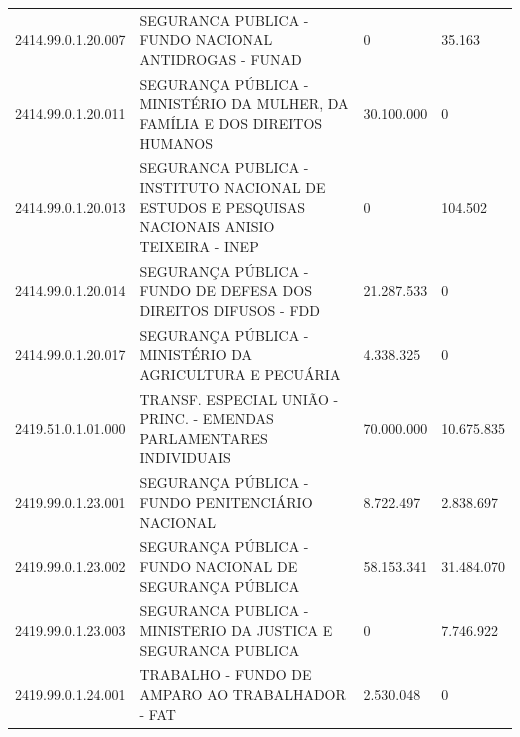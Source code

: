 \documentclass{article}
\begin{document}
\begin{longtable}[c]{m{2cm}|m{11cm}|m{2cm}m{2cm}}
\multicolumn{1}{C{2cm}|}{2414.99.0.1.20.007} & \multicolumn{1}{L{11cm}|}{SEGURANCA PUBLICA - FUNDO NACIONAL ANTIDROGAS - FUNAD} & \multicolumn{1}{R{2cm}|}{            0} & \multicolumn{1}{R{2cm}}{35.163} \\
\multicolumn{1}{C{2cm}|}{2414.99.0.1.20.011} & \multicolumn{1}{L{11cm}|}{SEGURANÇA PÚBLICA - MINISTÉRIO DA MULHER, DA FAMÍLIA E DOS DIREITOS HUMANOS} & \multicolumn{1}{R{2cm}|}{30.100.000} & \multicolumn{1}{R{2cm}}{            0} \\
\multicolumn{1}{C{2cm}|}{2414.99.0.1.20.013} & \multicolumn{1}{L{11cm}|}{SEGURANCA PUBLICA - INSTITUTO NACIONAL DE ESTUDOS E PESQUISAS NACIONAIS ANISIO TEIXEIRA - INEP} & \multicolumn{1}{R{2cm}|}{            0} & \multicolumn{1}{R{2cm}}{104.502} \\
\multicolumn{1}{C{2cm}|}{2414.99.0.1.20.014} & \multicolumn{1}{L{11cm}|}{SEGURANÇA PÚBLICA - FUNDO DE DEFESA DOS DIREITOS DIFUSOS - FDD} & \multicolumn{1}{R{2cm}|}{21.287.533} & \multicolumn{1}{R{2cm}}{            0} \\
\multicolumn{1}{C{2cm}|}{2414.99.0.1.20.017} & \multicolumn{1}{L{11cm}|}{SEGURANÇA PÚBLICA - MINISTÉRIO DA AGRICULTURA E PECUÁRIA} & \multicolumn{1}{R{2cm}|}{4.338.325} & \multicolumn{1}{R{2cm}}{            0} \\
\multicolumn{1}{C{2cm}|}{2419.51.0.1.01.000} & \multicolumn{1}{L{11cm}|}{TRANSF. ESPECIAL UNIÃO - PRINC. - EMENDAS PARLAMENTARES INDIVIDUAIS} & \multicolumn{1}{R{2cm}|}{70.000.000} & \multicolumn{1}{R{2cm}}{10.675.835} \\
\multicolumn{1}{C{2cm}|}{2419.99.0.1.23.001} & \multicolumn{1}{L{11cm}|}{SEGURANÇA PÚBLICA - FUNDO PENITENCIÁRIO NACIONAL} & \multicolumn{1}{R{2cm}|}{8.722.497} & \multicolumn{1}{R{2cm}}{2.838.697} \\
\multicolumn{1}{C{2cm}|}{2419.99.0.1.23.002} & \multicolumn{1}{L{11cm}|}{SEGURANÇA PÚBLICA - FUNDO NACIONAL DE SEGURANÇA PÚBLICA} & \multicolumn{1}{R{2cm}|}{58.153.341} & \multicolumn{1}{R{2cm}}{31.484.070} \\
\multicolumn{1}{C{2cm}|}{2419.99.0.1.23.003} & \multicolumn{1}{L{11cm}|}{SEGURANCA PUBLICA - MINISTERIO DA JUSTICA E SEGURANCA PUBLICA} & \multicolumn{1}{R{2cm}|}{            0} & \multicolumn{1}{R{2cm}}{7.746.922} \\
\multicolumn{1}{C{2cm}|}{2419.99.0.1.24.001} & \multicolumn{1}{L{11cm}|}{TRABALHO - FUNDO DE AMPARO AO TRABALHADOR - FAT} & \multicolumn{1}{R{2cm}|}{2.530.048} & \multicolumn{1}{R{2cm}}{            0} \\
\hline

\end{longtable}
\end{document}
